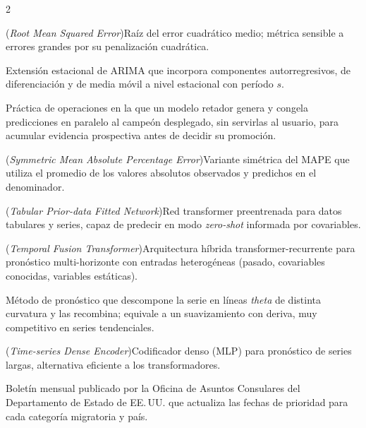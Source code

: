 \documentclass[12pt,letterpaper]{report}
\begin{document}
\begin{multicols}{2}
\begin{description}[leftmargin=0pt, labelindent=0pt, itemindent=0pt,
                    labelsep=0.4em, font=\bfseries\scriptsize,
                    itemsep=1pt, parsep=0pt, topsep=0pt]
    \item[RMSE] (\textit{Root Mean Squared Error})\hspace{0.3em}Raíz del error cuadrático medio; métrica sensible a errores grandes por su penalización cuadrática.

    \item[SARIMA] Extensión estacional de ARIMA que incorpora componentes autorregresivos, de diferenciación y de media móvil a nivel estacional con período $s$.
    \item[Shadow deployment (despliegue en sombra)] Práctica de operaciones en la que un modelo retador genera y congela predicciones en paralelo al campeón desplegado, sin servirlas al usuario, para acumular evidencia prospectiva antes de decidir su promoción.

    \item[sMAPE] (\textit{Symmetric Mean Absolute Percentage Error})\hspace{0.3em}Variante simétrica del MAPE que utiliza el promedio de los valores absolutos observados y predichos en el denominador.

    \item[TabPFN] (\textit{Tabular Prior-data Fitted Network})\hspace{0.3em}Red transformer preentrenada para datos tabulares y series, capaz de predecir en modo \textit{zero-shot} informada por covariables.

    \item[TFT] (\textit{Temporal Fusion Transformer})\hspace{0.3em}Arquitectura híbrida transformer-recurrente para pronóstico multi-horizonte con entradas heterogéneas (pasado, covariables conocidas, variables estáticas).

    \item[Theta (método)] Método de pronóstico que descompone la serie en líneas \textit{theta} de distinta curvatura y las recombina; equivale a un suavizamiento con deriva, muy competitivo en series tendenciales.

    \item[TiDE] (\textit{Time-series Dense Encoder})\hspace{0.3em}Codificador denso (MLP) para pronóstico de series largas, alternativa eficiente a los transformadores.

    \item[\textit{Visa Bulletin}] Boletín mensual publicado por la Oficina de Asuntos Consulares del Departamento de Estado de EE.\,UU. que actualiza las fechas de prioridad para cada categoría migratoria y país.


\end{description}
\end{multicols}
\end{document}
